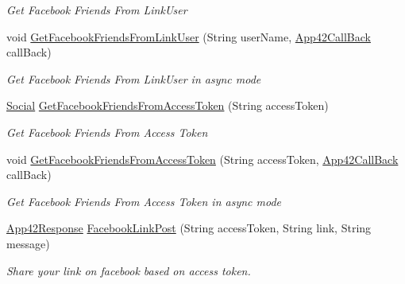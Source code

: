 \begin{DoxyCompactItemize}
\begin{DoxyCompactList}\small\item\em Get Facebook Friends From Link\+User \end{DoxyCompactList}\item 
void \hyperlink{classcom_1_1shephertz_1_1app42_1_1paas_1_1sdk_1_1csharp_1_1social_1_1_social_service_a8a9c7c1724d19bf8bf084fab5870d6a5}{Get\+Facebook\+Friends\+From\+Link\+User} (String user\+Name, \hyperlink{interfacecom_1_1shephertz_1_1app42_1_1paas_1_1sdk_1_1csharp_1_1_app42_call_back}{App42\+Call\+Back} call\+Back)
\begin{DoxyCompactList}\small\item\em Get Facebook Friends From Link\+User in async mode \end{DoxyCompactList}\item 
\hyperlink{classcom_1_1shephertz_1_1app42_1_1paas_1_1sdk_1_1csharp_1_1social_1_1_social}{Social} \hyperlink{classcom_1_1shephertz_1_1app42_1_1paas_1_1sdk_1_1csharp_1_1social_1_1_social_service_a6b2728a038efa5d45d6442187d5e7193}{Get\+Facebook\+Friends\+From\+Access\+Token} (String access\+Token)
\begin{DoxyCompactList}\small\item\em Get Facebook Friends From Access Token \end{DoxyCompactList}\item 
void \hyperlink{classcom_1_1shephertz_1_1app42_1_1paas_1_1sdk_1_1csharp_1_1social_1_1_social_service_ab13a7dcb22a44496ed4596f27e07eee2}{Get\+Facebook\+Friends\+From\+Access\+Token} (String access\+Token, \hyperlink{interfacecom_1_1shephertz_1_1app42_1_1paas_1_1sdk_1_1csharp_1_1_app42_call_back}{App42\+Call\+Back} call\+Back)
\begin{DoxyCompactList}\small\item\em Get Facebook Friends From Access Token in async mode \end{DoxyCompactList}\item 
\hyperlink{classcom_1_1shephertz_1_1app42_1_1paas_1_1sdk_1_1csharp_1_1_app42_response}{App42\+Response} \hyperlink{classcom_1_1shephertz_1_1app42_1_1paas_1_1sdk_1_1csharp_1_1social_1_1_social_service_ab3a01b337ff7301de88e2856ca7c3d21}{Facebook\+Link\+Post} (String access\+Token, String link, String message)
\begin{DoxyCompactList}\small\item\em Share your link on facebook based on access token. \end{DoxyCompactList}\item 

\end{DoxyCompactItemize}
